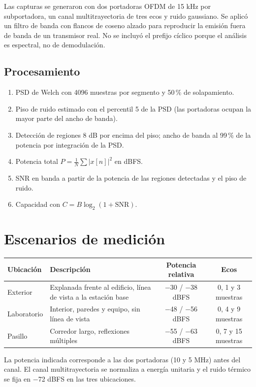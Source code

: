 \documentclass[11pt,a4paper]{article}
\begin{document}
Las capturas se generaron con dos portadoras OFDM de 15 kHz por subportadora, un canal
multitrayectoria de tres ecos y ruido gaussiano. Se aplicó un filtro de banda con flancos
de coseno alzado para reproducir la emisión fuera de banda de un transmisor real. No se
incluyó el prefijo cíclico porque el análisis es espectral, no de demodulación.

\subsection{Procesamiento}

\begin{enumerate}
  \item PSD de Welch con 4096 muestras por segmento y 50\,\% de solapamiento.
  \item Piso de ruido estimado con el percentil 5 de la PSD (las portadoras ocupan la mayor
        parte del ancho de banda).
  \item Detección de regiones 8 dB por encima del piso; ancho de banda al 99\,\% de la
        potencia por integración de la PSD.
  \item Potencia total $P=\frac{1}{N}\sum|x[n]|^2$ en dBFS.
  \item SNR en banda a partir de la potencia de las regiones detectadas y el piso de ruido.
  \item Capacidad con $C=B\log_2(1+\mathrm{SNR})$.
\end{enumerate}

\section{Escenarios de medición}

\begin{tabularx}{\linewidth}{@{}l>{\raggedright\arraybackslash}Xcc@{}}
  \toprule
  Ubicación & Descripción & Potencia relativa & Ecos \\
  \midrule
  Exterior & Explanada frente al edificio, línea de vista a la estación base &
  $-$30 / $-$38 dBFS & 0, 1 y 3 muestras \\
  Laboratorio & Interior, paredes y equipo, sin línea de vista &
  $-$48 / $-$56 dBFS & 0, 4 y 9 muestras \\
  Pasillo & Corredor largo, reflexiones múltiples &
  $-$55 / $-$63 dBFS & 0, 7 y 15 muestras \\
  \bottomrule
\end{tabularx}

La potencia indicada corresponde a las dos portadoras (10 y 5 MHz) antes del canal. El
canal multitrayectoria se normaliza a energía unitaria y el ruido térmico se fija en
$-$72 dBFS en las tres ubicaciones.
\end{document}
